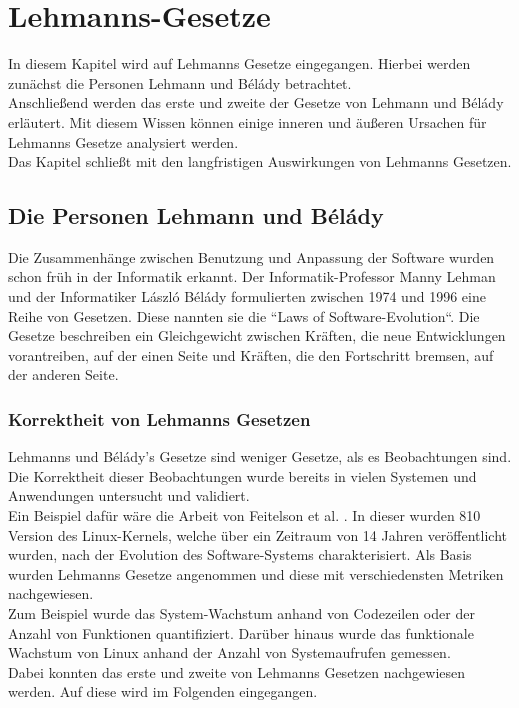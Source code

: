 \chapter{Lehmanns-Gesetze}
\label{chapter2}
In diesem Kapitel wird auf Lehmanns Gesetze eingegangen. Hierbei werden zunächst die Personen Lehmann und Bélády betrachtet.\\
Anschließend werden das erste und zweite der Gesetze von Lehmann und Bélády erläutert. Mit diesem Wissen können einige inneren und äußeren Ursachen für Lehmanns Gesetze analysiert werden.\\
Das Kapitel schließt mit den langfristigen Auswirkungen von Lehmanns Gesetzen. 

\section{Die Personen Lehmann und Bélády}
Die Zusammenhänge zwischen Benutzung und Anpassung der Software wurden schon früh in der Informatik erkannt. Der Informatik-Professor Manny Lehman und der Informatiker László Bélády formulierten zwischen 1974 und 1996 eine Reihe von Gesetzen. Diese nannten sie die “Laws of Software-Evolution“. Die Gesetze beschreiben ein Gleichgewicht zwischen Kräften, die neue Entwicklungen vorantreiben, auf der einen Seite und Kräften, die den Fortschritt bremsen, auf der anderen Seite. \cite{lehman_understanding_1979}

\subsection{Korrektheit von Lehmanns Gesetzen}
Lehmanns und Bélády’s Gesetze sind weniger Gesetze, als es Beobachtungen sind. Die Korrektheit dieser Beobachtungen wurde bereits in vielen Systemen und Anwendungen untersucht und validiert.\\
Ein Beispiel dafür wäre die Arbeit von Feitelson et al. \cite{israeli_linux_2010}. In dieser wurden 810 Version des Linux-Kernels, welche über ein Zeitraum von 14 Jahren veröffentlicht wurden, nach der Evolution des Software-Systems charakterisiert. Als Basis wurden Lehmanns Gesetze angenommen und diese mit verschiedensten Metriken nachgewiesen. \\
Zum Beispiel wurde das System-Wachstum anhand von Codezeilen oder der Anzahl von Funktionen quantifiziert. Darüber hinaus wurde das funktionale Wachstum von Linux anhand der Anzahl von Systemaufrufen gemessen.\\
Dabei konnten das erste und zweite von Lehmanns Gesetzen nachgewiesen werden. Auf diese wird im Folgenden eingegangen.

